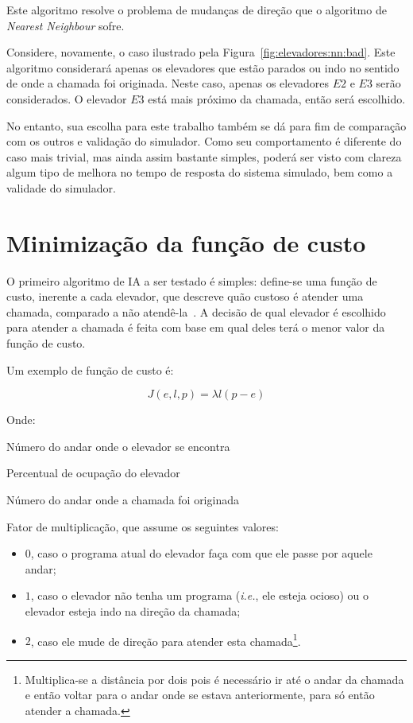 Este algoritmo resolve o problema de mudanças de direção que o algoritmo de
\textit{Nearest Neighbour} sofre.

Considere, novamente, o caso ilustrado pela Figura~\ref{fig:elevadores:nn:bad}.
Este algoritmo considerará apenas os elevadores que estão parados ou indo no
sentido de onde a chamada foi originada. Neste caso, apenas os elevadores $E2$ e
$E3$ serão considerados. O elevador $E3$ está mais próximo da chamada, então
será escolhido.

No entanto, sua escolha para este trabalho também se dá para fim de comparação
com os outros e validação do simulador. Como seu comportamento é diferente do
caso mais trivial, mas ainda assim bastante simples, poderá ser visto com clareza
algum tipo de melhora no tempo de resposta do sistema simulado, bem como a validade do simulador.

\section{\label{sec:ai:minimize-cost-function}Minimização da função de custo}

O primeiro algoritmo de IA a ser testado é simples: define-se uma
função de custo, inerente a cada elevador, que descreve quão custoso
é atender uma chamada, comparado a não atendê-la~\cite{Friese20061908}.
A decisão de qual elevador é escolhido para atender a chamada é feita com base
em qual deles terá o menor valor da função de custo.

Um exemplo de função de custo é:

\[
  J(e, l, p) = \lambda l(p - e)
\]

Onde:
\begin{description}[leftmargin=!,labelwidth=\widthof{\bfseries Pu}]
\item[$\boldsymbol{e}$] Número do andar onde o elevador se encontra
\item[$\boldsymbol{l}$] Percentual de ocupação do elevador
\item[$\boldsymbol{p}$] Número do andar onde a chamada foi originada
\item[$\boldsymbol{\lambda}$] Fator de multiplicação, que assume os seguintes valores:
  \begin{itemize}
    \item $0$, caso o programa atual do elevador faça com que ele passe por
      aquele andar;
    \item $1$, caso o elevador não tenha um programa (\textit{i.e.},
      ele esteja ocioso) ou o elevador esteja indo na direção da chamada;
    \item $2$, caso ele mude de direção para atender esta chamada\footnote{Multiplica-se
        a distância por dois pois é necessário ir até o andar da chamada e então
        voltar para o andar onde se estava anteriormente, para só então atender
        a chamada.}.
  \end{itemize}
\end{description}

